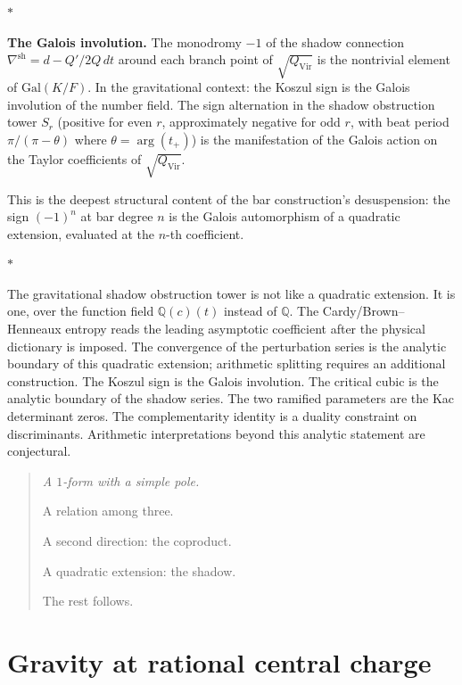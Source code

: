 \documentclass[11pt]{article}
\newcommand{\Q}{\mathbb{Q}}
\newcommand{\sep}{\bigskip\begin{center}$*$\end{center}\medskip}
\begin{document}
\sep

\noindent\textbf{The Galois involution.}\enspace
The monodromy $-1$ of the shadow connection
$\nabla^{\mathrm{sh}} = d - Q'/2Q\,dt$ around each branch
point of $\sqrt{Q_{\mathrm{Vir}}}$ is the nontrivial element
of $\mathrm{Gal}(K/F)$.  In the gravitational context: the
Koszul sign is the Galois involution of the number field.  The
sign alternation in the shadow obstruction tower $S_r$ (positive for even
$r$, approximately negative for odd $r$, with beat period
$\pi/(\pi - \theta)$ where $\theta = \arg(t_+)$) is the
manifestation of the Galois action on the Taylor coefficients
of $\sqrt{Q_{\mathrm{Vir}}}$.

This is the deepest structural content of the bar
construction's desuspension: the sign $(-1)^n$ at bar degree
$n$ is the Galois automorphism of a quadratic extension,
evaluated at the $n$-th coefficient.

\sep

The gravitational shadow obstruction tower is not like a quadratic
extension.  It is one, over the function field $\Q(c)(t)$
instead of $\Q$.  The Cardy/Brown--Henneaux entropy reads the
leading asymptotic coefficient after the physical dictionary is
imposed.  The convergence of the perturbation series is the
analytic boundary of this quadratic extension; arithmetic
splitting requires an additional construction.  The Koszul sign is the Galois involution.
The critical cubic is the analytic boundary of the shadow series.
The two ramified parameters are the Kac determinant zeros.  The
complementarity identity is a duality constraint on discriminants.
Arithmetic interpretations beyond this analytic statement are
conjectural.

\begin{quote}\itshape
A $1$-form with a simple pole.

A relation among three.

A second direction: the coproduct.

A quadratic extension: the shadow.

The rest follows.
\end{quote}


\section{Gravity at rational central charge}
\label{sec:gravity-rational-c}
\end{document}
